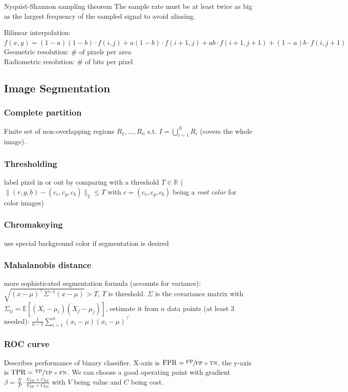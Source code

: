 \documentclass[a4paper,10pt]{article}
\begin{document}
\begin{mainbox}{Nyquist-Shannon sampling theorem}
    The sample rate must be at least twice as big as the largest frequency of the sampled signal to avoid aliasing.
\end{mainbox}

Bilinear interpolation: \(f(x,y) = (1-a)(1-b) \cdot f(i,j) + a(1-b) \cdot f(i+1,j) + ab \cdot f(i+1, j+1) + (1-a)b \cdot f(i,j+1)\) \\
Geometric resolution: \# of pixels per area \\
Radiometric resolution: \# of bits per pixel 

\subsection{Image Segmentation}
\subsubsection{Complete partition} 
Finite set of non-overlapping regions \( R_1, \dots, R_n \) s.t. \( I = \bigcup_{i=1}^N R_i \) (covers the whole image). 

\subsubsection{Thresholding} 
label pixel in or out by comparing with a threshold \( T \in \mathbb{R} \) (\( \lVert (r,g,b) - (c_r,c_g,c_b) \rVert_2 \le T \) with \( c = (c_r,c_g,c_b) \) being a \textit{root color} for color images)

\subsubsection{Chromakeying}
use special background color if segmentation is desired 

\subsubsection{Mahalanobis distance} 
more sophisticated segmentation formula (accounts for variance): \( \sqrt{(x - \mu)^\top \Sigma^{-1}(x - \mu)} > T \), \( T \) is threshold. \( \Sigma  \) is the covariance matrix with \( \Sigma_{ij} = \mathbb{E}\left[(X_i - \mu_i)(X_j - \mu_j) \right] \), estimate it from \( n \) data points (at least 3 needed): \( \frac{1}{n-1} \sum_{i=1}^{n} (x_i - \mu)(x_i - \mu)^\top \)

\subsubsection{ROC curve} 
Describes performance of binary classifier. X-axis is \( \text{FPR} = \sfrac{\text{FP}}{\text{FP}+\text{TN}} \), the y-axis is \( \text{TPR} = \sfrac{\text{TP}}{\text{TP} + \text{FN}} \). We can choose a good operating point with gradient \( \beta = \frac{N}{P} \cdot \frac{V_\text{TN} + C_\text{FP}}{V_\text{TP} + C_\text{FN}} \) with \( V \) being value and \( C \) being cost.
\end{document}
